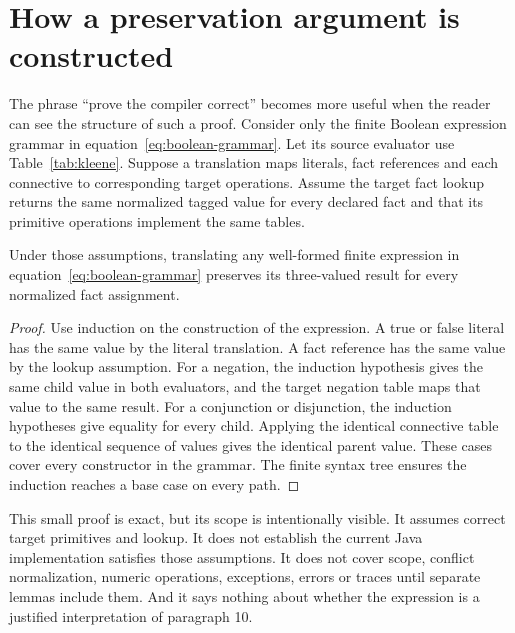 \section{How a preservation argument is constructed}
\label{merge:M03:08}

\label{sec:proof-induction}
The phrase ``prove the compiler correct'' becomes more useful when the reader
can see the structure of such a proof. Consider only the finite Boolean
expression grammar in equation~\eqref{eq:boolean-grammar}. Let its source
evaluator use Table~\ref{tab:kleene}. Suppose a translation maps literals,
fact references and each connective to corresponding target operations.
Assume the target fact lookup returns the same normalized tagged value for
every declared fact and that its primitive operations implement the same
tables.

\begin{proposition}
Under those assumptions, translating any well-formed finite expression in
equation~\eqref{eq:boolean-grammar} preserves its three-valued result for every
normalized fact assignment.
\label{prop:boolean-preservation}
\end{proposition}
\begin{proof}
Use induction on the construction of the expression. A true or false literal
has the same value by the literal translation. A fact reference has the same
value by the lookup assumption. For a negation, the induction hypothesis gives
the same child value in both evaluators, and the target negation table maps
that value to the same result. For a conjunction or disjunction, the induction
hypotheses give equality for every child. Applying the identical connective
table to the identical sequence of values gives the identical parent value.
These cases cover every constructor in the grammar. The finite syntax tree
ensures the induction reaches a base case on every path.
\end{proof}


This small proof is exact, but its scope is intentionally visible. It assumes
correct target primitives and lookup. It does not establish the current Java
implementation satisfies those assumptions. It does not cover scope, conflict
normalization, numeric operations, exceptions, errors or traces until separate
lemmas include them. And it says nothing about whether the expression is a
justified interpretation of paragraph 10.

